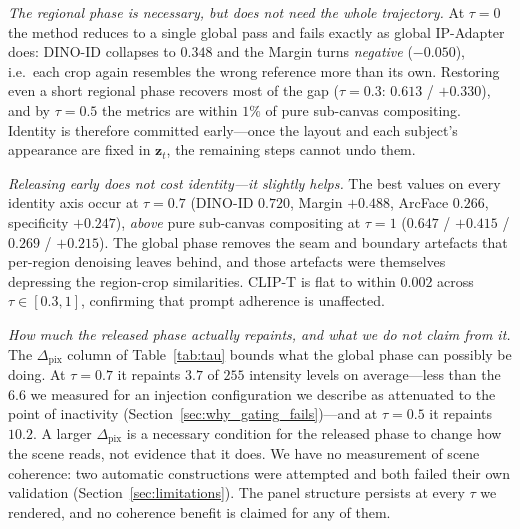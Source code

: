 \documentclass[10pt,twocolumn,letterpaper]{article}
\begin{document}
\noindent\textit{The regional phase is necessary, but does not need the
whole trajectory.}
At $\tau{=}0$ the method reduces to a single global pass and fails exactly
as global IP-Adapter does: DINO-ID collapses to $0.348$ and the Margin
turns \emph{negative} ($-0.050$), i.e.\ each crop again resembles the wrong
reference more than its own.  Restoring even a short regional phase
recovers most of the gap ($\tau{=}0.3$: $0.613$ / $+0.330$), and by
$\tau{=}0.5$ the metrics are within $1\%$ of pure sub-canvas compositing.
Identity is therefore committed early---once the layout and each subject's
appearance are fixed in $\mathbf{z}_t$, the remaining steps cannot undo
them.

\noindent\textit{Releasing early does not cost identity---it slightly helps.}
The best values on every identity axis occur at $\tau{=}0.7$
(DINO-ID $0.720$, Margin $+0.488$, ArcFace $0.266$, specificity $+0.247$),
\emph{above} pure sub-canvas compositing at $\tau{=}1$
($0.647$ / $+0.415$ / $0.269$ / $+0.215$).  The global phase removes the
seam and boundary artefacts that per-region denoising leaves behind, and
those artefacts were themselves depressing the region-crop similarities.
CLIP-T is flat to within $0.002$ across $\tau\in[0.3,1]$, confirming that
prompt adherence is unaffected.

\noindent\textit{How much the released phase actually repaints, and what we
do not claim from it.}
The $\Delta_{\mathrm{pix}}$ column of Table~\ref{tab:tau} bounds what the
global phase can possibly be doing.  At $\tau{=}0.7$ it repaints $3.7$ of
$255$ intensity levels on average---less than the $6.6$ we measured for an
injection configuration we describe as attenuated to the point of
inactivity (Section~\ref{sec:why_gating_fails})---and at $\tau{=}0.5$ it
repaints $10.2$.  A larger $\Delta_{\mathrm{pix}}$ is a necessary condition
for the released phase to change how the scene reads, not evidence that it
does.  We have no measurement of scene coherence: two automatic constructions were
attempted and both failed their own validation
(Section~\ref{sec:limitations}).  The panel structure persists at every
$\tau$ we rendered, and no coherence benefit is claimed for any of them.
\end{document}
